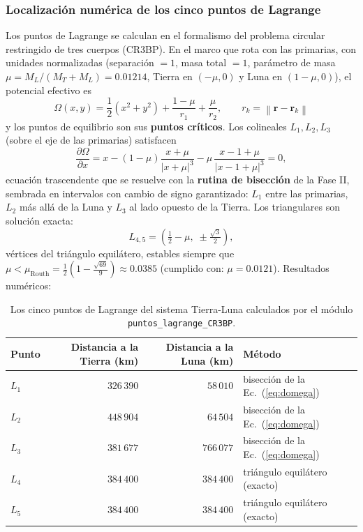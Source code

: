\documentclass[11pt, a4paper]{article}
\begin{document}
\subsubsection{Localización numérica de los cinco puntos de Lagrange}
\label{sec:lagrange}
Los puntos de Lagrange se calculan en el formalismo del problema circular restringido de
tres cuerpos (CR3BP). En el marco que rota con las primarias, con unidades normalizadas
(separación $=1$, masa total $=1$, parámetro de masa $\mu = M_L/(M_T+M_L) = 0.01214$,
Tierra en $(-\mu, 0)$ y Luna en $(1-\mu, 0)$), el potencial efectivo es
\begin{equation}
	\Omega(x, y) = \frac{1}{2}\left(x^2 + y^2\right) + \frac{1-\mu}{r_1} + \frac{\mu}{r_2},
	\qquad r_k = \left\|\mathbf{r} - \mathbf{r}_k\right\|
\end{equation}
y los puntos de equilibrio son sus \textbf{puntos críticos}. Los colineales
$L_1, L_2, L_3$ (sobre el eje de las primarias) satisfacen
\begin{equation}
	\frac{\partial \Omega}{\partial x} = x - (1-\mu)\frac{x+\mu}{|x+\mu|^3} - \mu\,\frac{x-1+\mu}{|x-1+\mu|^3} = 0,
	\label{eq:domega}
\end{equation}
ecuación trascendente que se resuelve con la \textbf{rutina de bisección} de la Fase II,
sembrada en intervalos con cambio de signo garantizado: $L_1$ entre las primarias,
$L_2$ más allá de la Luna y $L_3$ al lado opuesto de la Tierra. Los triangulares son
solución exacta:
\begin{equation}
	L_{4,5} = \left(\tfrac{1}{2} - \mu,\; \pm\tfrac{\sqrt{3}}{2}\right),
\end{equation}
vértices del triángulo equilátero, estables siempre que $\mu < \mu_{\text{Routh}} =
\tfrac{1}{2}\left(1 - \tfrac{\sqrt{69}}{9}\right) \approx 0.0385$ (cumplido con:
$\mu = 0.0121$). Resultados numéricos:

\begin{table}[H]
	\centering
	\begin{tabular}{lrrl}
		\toprule
		Punto & Distancia a la Tierra (km) & Distancia a la Luna (km) & Método \\
		\midrule
		$L_1$ & $326\,390$ & $58\,010$  & bisección de la Ec.~(\ref{eq:domega}) \\
		$L_2$ & $448\,904$ & $64\,504$  & bisección de la Ec.~(\ref{eq:domega}) \\
		$L_3$ & $381\,677$ & $766\,077$ & bisección de la Ec.~(\ref{eq:domega}) \\
		$L_4$ & $384\,400$ & $384\,400$ & triángulo equilátero (exacto) \\
		$L_5$ & $384\,400$ & $384\,400$ & triángulo equilátero (exacto) \\
		\bottomrule
	\end{tabular}
	\caption{Los cinco puntos de Lagrange del sistema Tierra-Luna calculados por el módulo \texttt{puntos\_lagrange\_CR3BP}.}
	\label{tab:lagrange}
\end{table}
\end{document}
